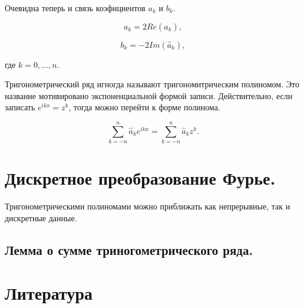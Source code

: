\documentclass[12pt, a4paper]{article}
\begin{document}
	Очевидна теперь и связь коэфициентов $a_k$ и $b_k$.
	
	\[
	a_k = 2 Re(\hat{a}_k),
	\]
	
	\[
	b_k = -2 Im(\hat{a}_k),
	\]
 	
 	где $k = 0, ..., n$.
 	
 	Тригонометрический ряд игногда называют тригономитрическим полиномом. Это название мотивировано экспоненциальной формой записи. Действительно, если записать $e^{ikx} = z^k$, тогда можно перейти к форме полинома.
 	
 	\[
 	\sum_{k=-n}^{n}\hat{a}_k e^{ikx} = \sum_{k=-n}^{n}\hat{a}_k z^k.
 	\]
 	
 	\section{Дискретное преобразование Фурье.}
 	Тригонометрическими полиномами можно приближать как непрерывные, так и дискретные данные.
 	
 	\subsection{Лемма о сумме триногометрического ряда.}
 	
 	
	\newpage
	\section{Литература}
	
\end{document}
